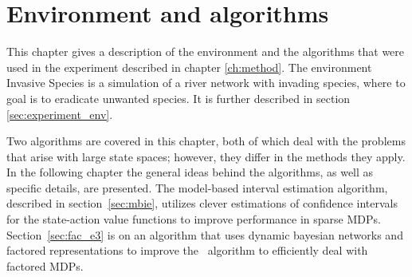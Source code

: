 \chapter{Environment and algorithms}
\label{ch:algo}

This chapter gives a description of the environment and the algorithms that
were used in the experiment described in chapter \ref{ch:method}. The environment Invasive Species is a simulation of a river network with invading species, where to goal is to eradicate unwanted species. It is further described in section \ref{sec:experiment_env}. 

Two algorithms are covered in this chapter, both of which deal with the
problems that arise with large state spaces; however, they differ in the
methods they apply. In the following chapter the general ideas behind the
algorithms, as well as specific details, are presented. The model-based interval estimation algorithm, described in
section~\ref{sec:mbie}, utilizes clever estimations of confidence intervals for
the state-action value functions to improve performance in sparse MDPs.
Section~\ref{sec:fac_e3} is on an algorithm that uses dynamic bayesian networks
and factored representations to improve the \etre\ algorithm to efficiently
deal with factored MDPs. 




